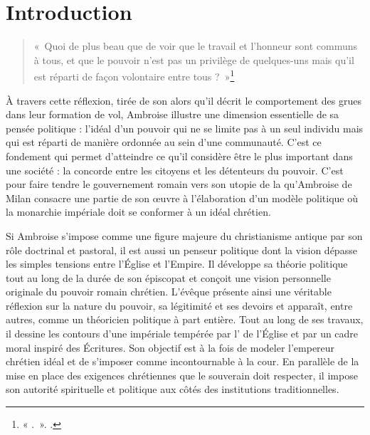 \chapter*{Introduction}
\clearpage

\begin{quote}
    «~Quoi de plus beau que de voir que le travail et l’honneur sont communs à tous, et que le pouvoir n’est pas un privilège de quelques-uns mais qu’il est réparti de façon volontaire entre tous ?~»\footnote{« .~». \cite[\nopp {}, V, 15, 51]{ambroise_csel_32_1}.}
\end{quote}

\bigskip

À travers cette réflexion, tirée de son  alors qu’il décrit le comportement des grues dans leur formation de vol, Ambroise illustre une dimension essentielle de sa pensée politique : l’idéal d’un pouvoir qui ne se limite pas à un seul individu mais qui est réparti de manière ordonnée au sein d’une communauté. C'est ce fondement qui permet d'atteindre ce qu'il considère être le plus important dans une société : la concorde entre les citoyens et les détenteurs du pouvoir. C'est pour faire tendre le gouvernement romain vers son utopie de la  qu’Ambroise de Milan consacre une partie de son œuvre à l’élaboration d’un modèle politique où la monarchie impériale doit se conformer à un idéal chrétien.

\bigskip

Si Ambroise s’impose comme une figure majeure du christianisme antique par son rôle doctrinal et pastoral, il est aussi un penseur politique dont la vision dépasse les simples tensions entre l’Église et l’Empire. Il développe sa théorie politique tout au long de la durée de son épiscopat et conçoit une vision personnelle originale du pouvoir romain chrétien. L’évêque présente ainsi une véritable réflexion sur la nature du pouvoir, sa légitimité et ses devoirs et apparaît, entre autres, comme un théoricien politique à part entière. Tout au long de ses travaux, il dessine les contours d’une  impériale tempérée par l’ de l’Église et par un cadre moral inspiré des Écritures. Son objectif est à la fois de modeler l'empereur chrétien idéal et de s'imposer comme incontournable à la cour. En parallèle de la mise en place des exigences chrétiennes que le souverain doit respecter, il impose son autorité spirituelle et politique aux côtés des institutions traditionnelles.

